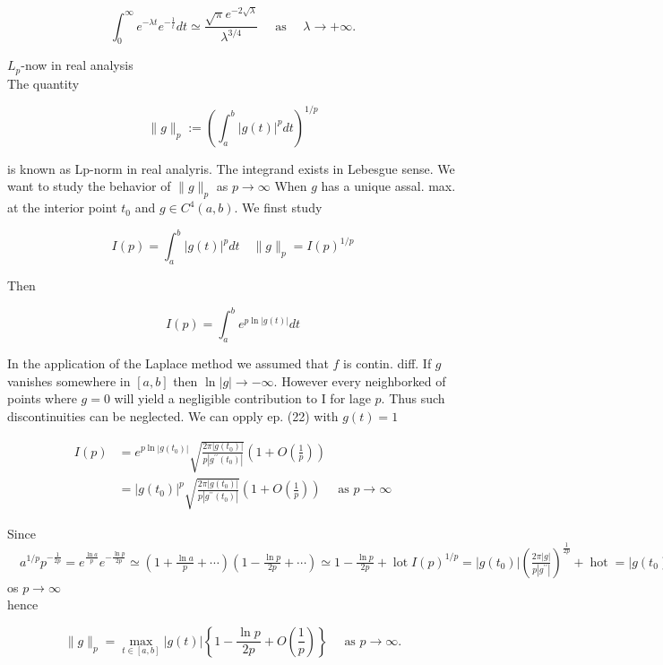 \documentclass[10pt]{article}
\begin{document}
$$
\int_{0}^{\infty} e^{-\lambda t} e^{-\frac{1}{t}} d t \simeq \frac{\sqrt{\pi} e^{-2 \sqrt{\lambda}}}{\lambda^{3 / 4}} \quad \text { as } \quad \lambda \rightarrow+\infty .
$$

$L_{p}$-now in real analysis\\
The quantity

$$
\|g\|_{p}:=\left(\int_{a}^{b}|g(t)|^{p} d t\right)^{1 / p}
$$

is known as Lp-norm in real analyris. The integrand exists in Lebesgue sense. We want to study the behavior of $\|g\|_{p}$ as $p \rightarrow \infty$ When $g$ has a unique assal. max. at the interior point $t_{0}$ and $g \in C^{4}(a, b)$. We finst study

$$
I(p)=\int_{a}^{b}|g(t)|^{p} d t \quad\|g\|_{p}=I(p)^{1 / p}
$$

Then

$$
I(p)=\int_{a}^{b} e^{p \ln |g(t)|} d t
$$

In the application of the Laplace method we assumed that $f$ is contin. diff. If $g$ vanishes somewhere in $[a, b]$ then $\ln |g| \rightarrow-\infty$. However every neighborked of points where $g=0$ will yield a negligible contribution to I for lage $p$. Thus such discontinuities can be neglected. We can opply ep. (22) with $g(t)=1$

$$
\begin{aligned}
I(p) & =e^{p \ln \left|g\left(t_{0}\right)\right|} \sqrt{\frac{2 \pi\left|g\left(t_{0}\right)\right|}{p\left|g^{\prime \prime}\left(t_{0}\right)\right|}}\left(1+O\left(\frac{1}{p}\right)\right) \\
& =\left|g\left(t_{0}\right)\right|^{p} \sqrt{\frac{2 \pi\left|g\left(t_{0}\right)\right|}{p\left|g^{\prime \prime}\left(t_{0}\right)\right|}}\left(1+O\left(\frac{1}{p}\right)\right) \quad \text { as } p \rightarrow \infty
\end{aligned}
$$

Since $\quad a^{1 / p} p^{-\frac{1}{2 p}}=e^{\frac{\ln a}{p}} e^{-\frac{\ln p}{2 p}} \simeq\left(1+\frac{\ln a}{p}+\cdots\right)\left(1-\frac{\ln p}{2 p}+\cdots\right) \simeq 1-\frac{\ln p}{2 p}+\operatorname{lot} I(p)^{1 / p}=\left|g\left(t_{0}\right)\right|\left(\frac{2 \pi|g|}{p\left|g^{\prime \prime}\right|}\right)^{\frac{1}{2 p}}+\operatorname{hot}=\left|g\left(t_{0}\right)\right|\left(1-\frac{\ln p}{2 p}+O\left(\frac{1}{p}\right)\right)$ os $p \rightarrow \infty$\\
hence

$$
\|g\|_{p}=\max _{t \in[a, b]}|g(t)|\left\{1-\frac{\ln p}{2 p}+O\left(\frac{1}{p}\right)\right\} \quad \text { as } p \rightarrow \infty .
$$
\end{document}
